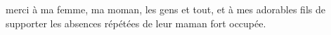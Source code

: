 merci à ma femme, ma moman, les gens et tout, et à mes adorables fils de 
supporter les absences répétées de leur maman fort occupée.